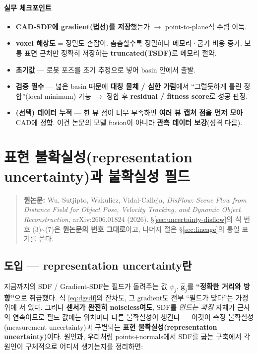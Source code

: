 \paragraph{실무 체크포인트}
\begin{itemize}
  \item[$\square$] \textbf{CAD-SDF에 gradient(법선)를 저장}했는가 $\to$
  point-to-plane식 수렴 이득.
  \item[$\square$] \textbf{voxel 해상도} = 정밀도 손잡이. 촘촘할수록 정밀하나
  메모리·굽기 비용 증가. 보통 표면 근처만 정확히 저장하는
  \textbf{truncated(TSDF)}로 메모리 절약.
  \item[$\square$] \textbf{초기값} --- 로봇 포즈를 초기 추정으로 넣어 basin
  안에서 출발.
  \item[$\square$] \textbf{검증 필수} --- 넓은 basin 때문에 \textbf{대칭 물체 /
  심한 가림}에서 ``그럴듯하게 틀린 정합''(local minimum) 가능 $\to$ 정합 후
  \textbf{residual / fitness score}로 성공 판정.
  \item[$\square$] \textbf{(선택) 데이터 누적} --- 한 뷰 점이 너무 부족하면
  \textbf{여러 뷰 캡쳐 점을 먼저 모아} CAD에 정합. 이건 논문의 모델 fusion이
  아니라 \textbf{관측 데이터 보강}(성격 다름).
\end{itemize}


\section{표현 불확실성(representation uncertainty)과 불확실성 필드}
\label{sec:uncertainty}

\begin{quote}
  \small\textbf{원논문:} Wu, Sutjipto, Wakulicz, Vidal-Calleja,
  \emph{DisFlow: Scene Flow from Distance Field for Object Pose, Velocity
  Tracking, and Dynamic Object Reconstruction}, arXiv:2606.01824 (2026).
  \S\ref{sec:uncertainty-disflow}의 식 번호 (3)\textasciitilde(7)은
  \textbf{원논문의 번호 그대로}이고, 나머지 절은 \S\ref{sec:lineage}의
  통일 표기를 쓴다.
\end{quote}

\subsection{도입 --- representation uncertainty란}

지금까지의 SDF / Gradient-SDF는 필드가 돌려주는 값 $\psi_j$,
$\hat{\mathbf{g}}_j$를 \textbf{``정확한 거리와 방향''}으로 취급했다. 식
\eqref{eq:dgsdf}의 잔차도, 그 gradient도 전부 ``필드가 맞다''는 가정 위에
서 있다. 그러나 \textbf{센서가 완전히 noiseless여도}, SDF를 \emph{만드는
과정} 자체가 근사의 연속이므로 필드 값에는 위치마다 다른 불확실성이
생긴다 --- 이것이 측정 불확실성(measurement uncertainty)과 구별되는
\textbf{표현 불확실성(representation uncertainty)}이다. 원인과, 우리처럼
points+normals에서 SDF를 굽는 구축에서 각 원인이 구체적으로 어디서
생기는지를 정리하면:

